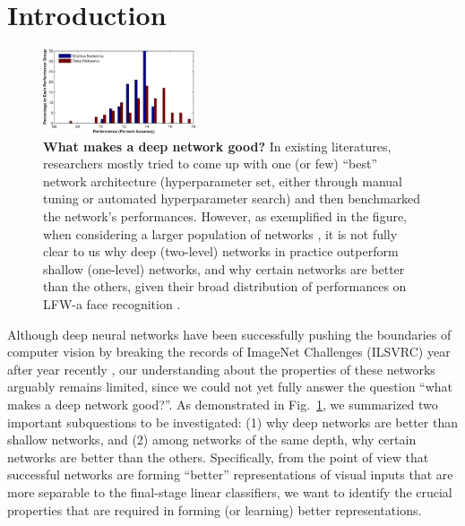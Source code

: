 \documentclass[10pt,twocolumn,letterpaper]{article}
\begin{document}
\section{Introduction}

\begin{figure}
\begin{center}
\includegraphics[width=0.40\textwidth]{Figs/e_fig7s_compact-crop.pdf} 
\end{center}
\caption{{\bf What makes a deep network good?}
In existing literatures, researchers mostly tried to come up with one (or few) ``best'' network architecture (\ie hyperparameter set, either through manual tuning or automated hyperparameter search) and then benchmarked the network's performances.
However, as exemplified in the figure, when considering a larger population of networks \cite{cox2011beyond}, it is not fully clear to us why deep (\eg two-level) networks in practice outperform shallow (\eg one-level) networks, and why certain networks are better than the others, given their broad distribution of performances on LFW-a face recognition \cite{LFWTech, wolf2011effective}.
} %
\label{fig:perf}
\end{figure}

Although deep neural networks have been successfully pushing the boundaries of computer vision by breaking the records of ImageNet Challenges (ILSVRC) year after year recently \cite{krizhevsky2012imagenet, sermanet2013overfeat, szegedy2014going}, our understanding about the properties of these networks arguably remains limited, since we could not yet fully answer the question ``what makes a deep network good?''.
As demonstrated in Fig.~\ref{fig:perf}, we summarized two important subquestions to be investigated: (1) why deep networks are better than shallow networks, and (2) among networks of the same depth, why certain networks are better than the others.
Specifically, from the point of view that successful networks are forming ``better'' representations of visual inputs that are more separable to the final-stage linear classifiers, we want to identify the crucial properties that are required in forming (or learning) better representations.
\end{document}
